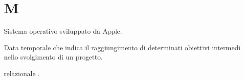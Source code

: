 \section{M}

Sistema operativo sviluppato da Apple.

Data temporale che indica il raggiungimento di determinati obiettivi intermedi nello svolgimento di un progetto. 


 relazionale .

